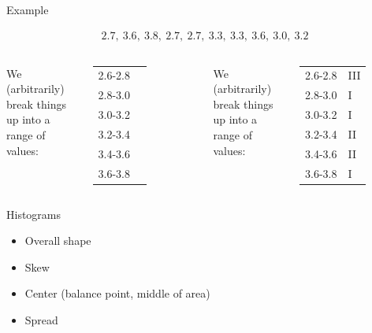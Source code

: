\begin{frame}{Example}

  \begin{eqnarray*}
    2.7,~3.6,~3.8,~2.7,~2.7,~3.3,~3.3,~3.6,~3.0,~3.2
  \end{eqnarray*}


  \begin{columns}

    {
      We (arbitrarily) break things up into a range of values: \\
      \begin{tabular}{l|l}
        2.6-2.8 \\
        2.8-3.0 \\
        3.0-3.2 \\
        3.2-3.4 \\
        3.4-3.6 \\
        3.6-3.8
      \end{tabular}
    }

    {
      We (arbitrarily) break things up into a range of values: \\
      \begin{tabular}{l|l}
        2.6-2.8 & III\\
        2.8-3.0 & I \\
        3.0-3.2 & I \\
        3.2-3.4 & II \\
        3.4-3.6 & II \\
        3.6-3.8 & I
      \end{tabular}
    }
    


  \end{columns}

  
\end{frame}

\begin{frame}{Histograms}

  \begin{itemize}
  \item Overall shape 
  \item Skew
  \item Center (balance point, middle of area)
  \item Spread
  \end{itemize}
  
\end{frame}

